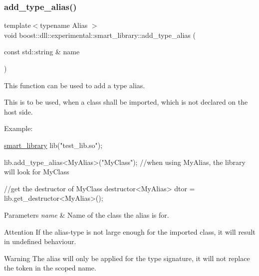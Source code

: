 \subsubsection{\texorpdfstring{add\+\_\+type\+\_\+alias()}{add\_type\_alias()}}
{\footnotesize\ttfamily template$<$typename Alias $>$ \\
void boost\+::dll\+::experimental\+::smart\+\_\+library\+::add\+\_\+type\+\_\+alias (\begin{DoxyParamCaption}\item[{const std\+::string \&}]{name }\end{DoxyParamCaption})\hspace{0.3cm}{\ttfamily [inline]}}

This function can be used to add a type alias.

This is to be used, when a class shall be imported, which is not declared on the host side.

Example\+: 
\begin{DoxyCode}
\hyperlink{a01712_af1fa4c4ed871e889f92f4c11d574d91f}{smart\_library} lib(\textcolor{stringliteral}{"test\_lib.so"});

lib.add\_type\_alias<MyAlias>(\textcolor{stringliteral}{"MyClass"}); \textcolor{comment}{//when using MyAlias, the library will look for MyClass}

\textcolor{comment}{//get the destructor of MyClass}
destructor<MyAlias> dtor = lib.get\_destructor<MyAlias>();
\end{DoxyCode}



\begin{DoxyParams}{Parameters}
{\em name} & Name of the class the alias is for.\\
\hline
\end{DoxyParams}
\begin{DoxyAttention}{Attention}
If the alias-\/type is not large enough for the imported class, it will result in undefined behaviour. 
\end{DoxyAttention}
\begin{DoxyWarning}{Warning}
The alias will only be applied for the type signature, it will not replace the token in the scoped name. 
\end{DoxyWarning}
\mbox{\label{a01712_a0e0a4b60a6f388ad6d97bddee1b2b9d6}} 
